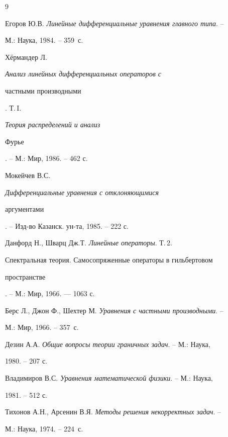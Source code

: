 \begin{thebibliography}{9} 


 




Егоров Ю.В. {\em Линейные дифференциальные уравнения главного типа}. -- 


М.: Наука, 1984. -- 359~с. 




Х\"ермандер Л. {\em Анализ линейных дифференциальных операторов с 


частными производными}. Т.\,I. {\em Теория распределений и анализ 


Фурье}. -- М.: Мир, 1986. -- 462 с. 




Мокейчев В.С. {\em Дифференциальные уравнения с отклоняющимися 


аргументами}. -- Изд-во Казанск. ун-та, 1985. -- 222 с. 




Данфорд Н., Шварц Дж.Т. {\em Линейные операторы}. Т.\,2. {\em 


Спектральная теория. Самосопряженные операторы в гильбертовом 


пространстве}. -- М.: Мир, 1966. --- 1063 с. 




Берс Л., Джон Ф., Шехтер М. {\em Уравнения с частными производными}. -- 


М.: Мир, 1966. -- 357~с. 




Дезин А.А. {\em Общие вопросы теории граничных задач}. -- М.: Наука, 


1980. -- 207 с. 




Владимиров В.С. {\em Уравнения математической физики}. -- М.: Наука, 


1981. -- 512 с. 




Тихонов А.Н., Арсенин В.Я. {\em Методы решения некорректных задач}. -- 


М.: Наука, 1974. -- 224~с. 


 


 


\end{thebibliography} 


 


\vskip 2cm 


 






 


\label{end} 


 


